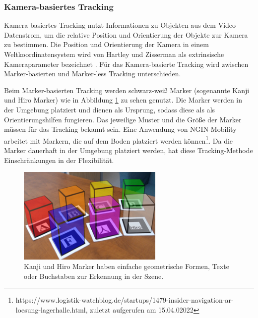 \subsubsection{Kamera-basiertes Tracking}
\label{tracking-kamerabasiertes-tracking}
Kamera-basiertes Tracking nutzt Informationen zu Objekten aus dem Video Datenstrom, um die relative Position und Orientierung der Objekte zur Kamera zu bestimmen. Die Position und Orientierung der Kamera in einem Weltkoordinatensystem wird von Hartley und Zisserman als extrinsische Kameraparameter bezeichnet \cite*[Hartley, Zisserman (2003) S.156]{hartleyzisserman}. Für das Kamera-basierte Tracking wird zwischen Marker-basierten und Marker-less Tracking unterschieden.

Beim Marker-basierten Tracking werden schwarz-weiß Marker (sogenannte Kanji und Hiro Marker) wie in Abbildung \ref{fig: tracking_kanji_hiro} zu sehen genutzt. Die Marker werden in der Umgebung platziert und dienen als Ursprung, sodass diese als als Orientierungshilfen fungieren. Das jeweilige Muster und die Größe der Marker müssen für das Tracking bekannt sein. Eine Anwendung von NGIN-Mobility arbeitet mit Markern, die auf dem Boden platziert werden können\footnote{https://www.logistik-watchblog.de/startups/1479-insider-navigation-ar-loesung-lagerhalle.html, zuletzt aufgerufen am 15.04.02022}. Da die Marker dauerhaft in der Umgebung platziert werden, hat diese Tracking-Methode Einschränkungen in der Flexibilität.

\begin{figure}[H]
    \centering
    \includegraphics[width=7cm]{img/tracking/kanjo-hiro-marker.png}
    \caption[Kanji und Hiro Marker haben einfache geometrische Formen, Texte oder Buchstaben zur Erkennung in der Szene.]{Kanji und Hiro Marker haben einfache geometrische Formen, Texte oder Buchstaben zur Erkennung in der Szene\protect\footnotemark.}
    \label{fig: tracking_kanji_hiro}
\end{figure}


